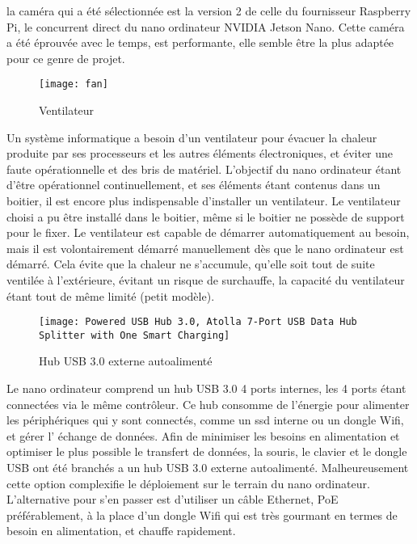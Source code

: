 \par la caméra qui a été sélectionnée est la version 2 de celle du fournisseur Raspberry Pi, le concurrent direct du nano ordinateur NVIDIA Jetson Nano. Cette caméra a été éprouvée avec le temps, est performante, elle semble être la plus adaptée pour ce genre de projet. 
\begin{figure}[H]
    \centering
    \texttt{[image: fan]}
    \caption{Ventilateur}
    \label{fig:fan}
\end{figure}
\par Un système informatique a besoin d'un ventilateur pour évacuer la chaleur produite par ses processeurs et les autres éléments électroniques, et éviter une faute opérationnelle et des bris de matériel. L'objectif du nano ordinateur étant d'être opérationnel continuellement, et ses éléments étant contenus dans un boitier, il est encore plus indispensable d'installer un ventilateur. Le ventilateur choisi a pu être installé dans le boitier, même si le boitier ne possède de support pour le fixer. Le ventilateur est capable de démarrer automatiquement au besoin, mais il est volontairement démarré manuellement dès que le nano ordinateur est démarré. Cela évite que la chaleur ne s'accumule, qu'elle soit tout de suite ventilée à l'extérieure, évitant un risque de surchauffe, la capacité du ventilateur étant tout de même limité (petit modèle).
\begin{figure}[H]
    \centering
    \texttt{[image: Powered USB Hub 3.0, Atolla 7-Port USB Data Hub Splitter with One Smart Charging]}
    \caption{Hub USB 3.0 externe autoalimenté}
    \label{fig:hubusb}
\end{figure}
\par Le nano ordinateur comprend un hub USB 3.0 4 ports internes, les 4 ports étant connectées via le même contrôleur. Ce hub consomme de l'énergie pour alimenter les périphériques qui y sont connectés, comme un \acrshort{ssd} interne ou un dongle Wifi, et gérer l’ échange de données. Afin de minimiser les besoins en alimentation et optimiser le plus possible le transfert de données, la souris, le clavier et le dongle USB ont été branchés a un hub USB 3.0 externe autoalimenté. Malheureusement cette option complexifie le déploiement sur le terrain du nano ordinateur. L'alternative pour s'en passer est d'utiliser un câble Ethernet, PoE préférablement, à la place d'un dongle Wifi qui est très gourmant en termes de besoin en alimentation, et chauffe rapidement.

